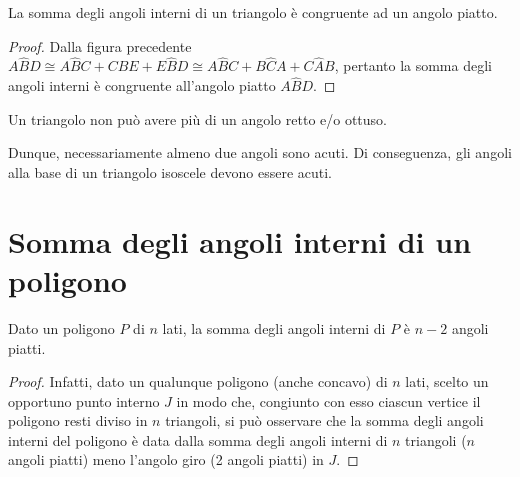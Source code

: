 \begin{corollario}
  La somma degli angoli interni di un triangolo è congruente ad un 
  angolo piatto.
\end{corollario}
\begin{proof}
  Dalla figura precedente $A\widehat{B}D\cong A\widehat{B}C + 
  C\widehat{B}E + E\widehat{B}D\cong A\widehat{B}C + B\widehat{C}A + 
  C\widehat{A}B$, pertanto la somma degli angoli interni è congruente 
  all'angolo piatto $A\widehat{B}D$.
\end{proof}
\begin{corollario}
  Un triangolo non può avere più di un angolo retto e/o ottuso.
\end{corollario}
Dunque, necessariamente almeno due angoli sono acuti. Di conseguenza, 
gli angoli alla base di un triangolo isoscele devono essere acuti.

\section{Somma degli angoli interni di un poligono}
  \label{sect:angoli_interni_poligono}

\begin{teorema}
  Dato un poligono $P$ di $n$ lati, la somma degli angoli interni di 
  $P$ è $n-2$ angoli piatti.
\end{teorema}
\noindent \begin{minipage}{0.5\textwidth}
  \begin{proof}
    Infatti, dato un qualunque poligono (anche concavo) di $n$ lati, 
    scelto un opportuno punto interno $J$ in modo che, congiunto con esso 
    ciascun vertice il poligono resti diviso in $n$ triangoli, si può 
    osservare che la somma degli angoli interni del poligono è data dalla 
    somma degli angoli interni di $n$ triangoli ($n$ angoli piatti) meno 
    l'angolo giro (2 angoli piatti) in $J$.
  \end{proof}
\end{minipage}\hfil
\begin{minipage}{0.5\textwidth}
  \centering
\end{minipage}

